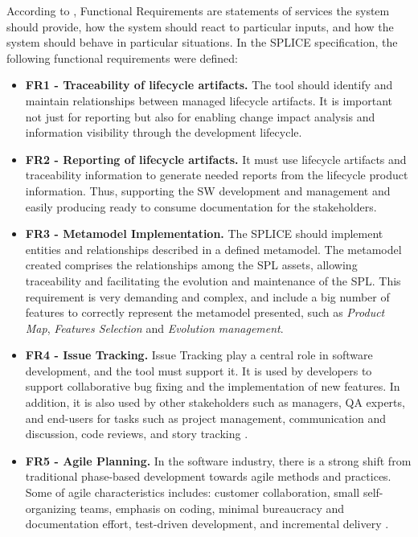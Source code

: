 According to \cite{Sommerville2007} , Functional Requirements are statements of services the system should provide, how the system should react to particular inputs, and how the system should behave in particular situations. In the \ac{SPLICE} specification, the following functional requirements were defined:

\begin{itemize}
\item  \textbf{FR1 - Traceability of lifecycle artifacts.} The tool should identify and  maintain relationships between managed lifecycle artifacts. It is important not just for reporting but also for enabling change impact analysis and information visibility through the development lifecycle.

\item  \textbf{FR2 - Reporting of lifecycle artifacts.} It must use lifecycle artifacts and traceability information to generate needed reports from the lifecycle product information. Thus, supporting the \ac{SW} development and management and easily producing ready to consume documentation for the stakeholders.



\item  \textbf{FR3 - Metamodel Implementation.} The \ac{SPLICE} should implement entities and relationships described in a defined metamodel. The metamodel created comprises the relationships among the SPL assets, allowing traceability and facilitating the evolution and maintenance of the SPL. This requirement is very demanding and complex, and include a big number of features to correctly represent the metamodel presented, such as \textit{Product Map}, \textit{Features Selection} and \textit{Evolution management}.


\item  \textbf{FR4 - Issue Tracking.} Issue Tracking play a central role in software development, and the tool must support it. It is used by developers to support collaborative bug fixing and the implementation of new features. In addition, it is also used by other stakeholders such as managers, QA experts, and end-users for tasks such as project management, communication and discussion, code reviews, and story tracking \citep{Baysal2013}.
 
\item  \textbf{FR5 - Agile Planning.} In the software industry, there is a strong shift from traditional phase-based development towards agile methods and practices. Some of agile characteristics includes: customer collaboration, small self-organizing teams, emphasis on coding, minimal bureaucracy and documentation effort, test-driven development, and incremental delivery \citep{Hochmuller2011}.


\end{itemize}
